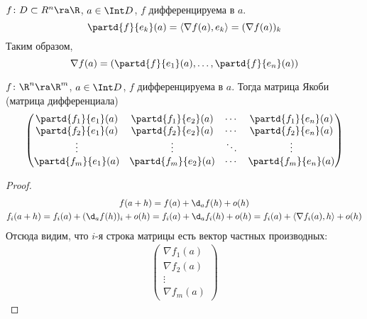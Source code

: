 \begin{conseq}
	$f\colon D \subset R^n \ra \R$, $a \in \Int D$, $f$ дифференцируема в $a$.
	\[ \partd{f}{e_k} (a) = \left<\nabla f(a), e_k\right> = (\nabla f(a))_k \]
	Таким образом,
	\[ \nabla f(a) = \left( \partd{f}{e_1} (a), \dots, \partd{f}{e_n} (a) \right) \]
\end{conseq}

\begin{conseq}
	$f\colon \R^n \ra \R^m$, $a \in \Int D$, $f$ дифференцируема в $a$.
	Тогда матрица Якоби (матрица дифференциала)
	\[\begin{pmatrix}
		\partd{f_1}{e_1}(a) & \partd{f_1}{e_2}(a)
			&\cdots& \partd{f_1}{e_n}(a) \\
		\partd{f_2}{e_1}(a) & \partd{f_2}{e_2}(a)
			&\cdots& \partd{f_2}{e_n}(a) \\
		\vdots & \vdots & \ddots & \vdots \\
		\partd{f_m}{e_1}(a) & \partd{f_m}{e_2}(a)
			&\cdots& \partd{f_m}{e_n}(a)
	\end{pmatrix}\]
\end{conseq}
\begin{proof}
	\begin{gather*}
		f(a + h) = f(a) + \d_a f(h) + o(h) \\
		f_i(a + h) = f_i(a) + (\d_a f(h))_i + o(h) = f_i(a) + \d_a f_i(h) + o(h) = f_i(a) + \left<\nabla f_i(a), h\right> + o(h)
	\end{gather*}
	Отсюда видим, что $i$-я строка матрицы есть вектор частных производных:
	\begin{gather*}
		\begin{pmatrix}
			\nabla f_1(a) \\
			\nabla f_2(a) \\
			\vdots \\
			\nabla f_m(a)
		\end{pmatrix}
	\end{gather*}
\end{proof}

